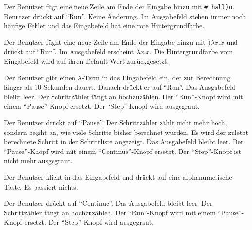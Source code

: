 \documentclass[parskip=full,11pt,twoside]{scrartcl}
\begin{document}
{Der Benutzer fügt eine neue Zeile am Ende der Eingabe hinzu mit \texttt{\# hall)o}. Benutzer drückt auf \enquote{Run}.}
{Keine Änderung. Im Ausgabefeld stehen immer noch häufige Fehler und das Eingabefeld hat eine rote Hintergrundfarbe.}

{Der Benutzer füght eine neue Zeile am Ende der Eingabe hinzu mit $) \lambda x.x$ und drückt auf \enquote{Run}.}
{Im Ausgabefeld erscheint $\lambda x.x$. Die Hintergrundfarbe vom Eingabefeld wird auf ihren Default-Wert zurückgesetzt.}


{Der Benutzer gibt einen $\lambda$-Term in das Eingabefeld ein, der zur Berechnung länger als 10 Sekunden dauert.
Danach drückt er auf \enquote{Run}.}
{Das Ausgabefeld bleibt leer. Der Schrittzähler fängt an hochzuzählen.
\newline Der \enquote{Run}-Knopf wird mit einem \enquote{Pause}-Knopf ersetzt.
\newline Der \enquote{Step}-Knopf wird ausgegraut.}

{Der Benutzer drückt auf \enquote{Pause}.}
{Der Schrittzähler zählt nicht mehr hoch, sondern zeight an, wie viele Schritte bisher berechnet wurden.
Es wird der zuletzt berechnete Schritt in der Schrittliste angezeigt. Das Ausgabefeld bleibt leer.
\newline Der \enquote{Pause}-Knopf wird mit einem \enquote{Continue}-Knopf ersetzt.
\newline Der \enquote{Step}-Knopf ist nicht mehr ausgegraut.}

{Der Benutzer klickt in das Eingabefeld und drückt auf eine alphanumerische Taste.}
{Es passiert nichts.}

{Der Benutzer drückt auf \enquote{Continue}.}
{Das Ausgabefeld bleibt leer. Der Schrittzähler fängt an hochzuzählen.
\newline Der \enquote{Run}-Knopf wird mit einem \enquote{Pause}-Knopf ersetzt.
\newline Der \enquote{Step}-Knopf wird ausgegraut.}
\end{document}
